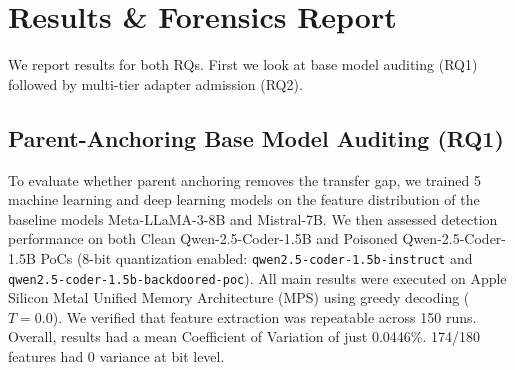 \documentclass[conference]{IEEEtran}
\begin{document}
\begin{table}[t]
\centering
\caption{Master 71-Target Benchmark Taxonomy}
\label{tab:target_suite}
\end{table}

\section{Results \& Forensics Report}
\label{sec:experiments}

We report results for both RQs. First we look at base model auditing (RQ1) followed by multi-tier adapter admission (RQ2).

\subsection{Parent-Anchoring Base Model Auditing (RQ1)}
\label{subsec:exp_rq1}

To evaluate whether parent anchoring removes the transfer gap, we trained 5 machine learning and deep learning models on the feature distribution of the baseline models Meta-LLaMA-3-8B and Mistral-7B. We then assessed detection performance on both Clean Qwen-2.5-Coder-1.5B and Poisoned Qwen-2.5-Coder-1.5B PoCs (8-bit quantization enabled: \nolinkurl{qwen2.5-coder-1.5b-instruct} and \nolinkurl{qwen2.5-coder-1.5b-backdoored-poc}). All main results were executed on Apple Silicon Metal Unified Memory Architecture (MPS) using greedy decoding ($T = 0.0$). We verified that feature extraction was repeatable across 150 runs. Overall, results had a mean Coefficient of Variation of just 0.0446\%. 174/180 features had 0 variance at bit level.
\end{document}
